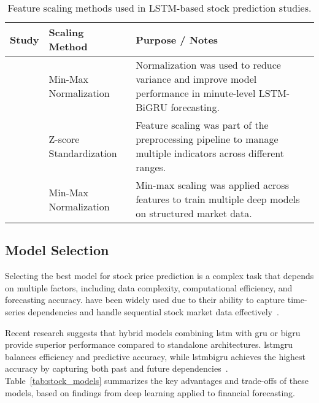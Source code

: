 \begin{table}[H]
\centering
\caption{Feature scaling methods used in LSTM-based stock prediction studies.}
\label{tab:feature-scaling}
\begin{tabular}{p{3.5cm}p{3.2cm}p{6.8cm}} \hline
\textbf{Study} & \textbf{Scaling Method} & \textbf{Purpose / Notes} \\ \hline\hline
\parencite{shaban2024SMPDL} & Min-Max Normalization & Normalization was used to reduce variance and improve model performance in minute-level LSTM-BiGRU forecasting. \\
\parencite{nabipour2020DeepLearning} & Z-score Standardization & Feature scaling was part of the preprocessing pipeline to manage multiple indicators across different ranges.  \\
\parencite{phuoc2024StockPrediction} & Min-Max Normalization & Min-max scaling was applied across features to train multiple deep models on structured market data.  \\
\hline
\end{tabular}
\end{table}

\subsection{Model Selection}

Selecting the best model for stock price prediction is a complex task that depends on
multiple factors, including data complexity, computational efficiency, and forecasting 
accuracy.  have been widely used due to their ability to capture 
time-series dependencies and handle sequential stock market data 
effectively~\parencite{shaban2024SMPDL}.

Recent research suggests that hybrid models combining \acrshort{lstm} with 
\acrshort{gru} or \acrshort{bigru} provide superior performance compared to standalone
architectures. \acrshort{lstmgru} balances efficiency and predictive accuracy, while 
\acrshort{lstmbigru} achieves the highest accuracy by capturing both past and future
dependencies~\parencite{chang2024StockPrediction}. Table~\ref{tab:stock_models} summarizes the key advantages and trade-offs of these models, based on findings from deep learning applied to financial forecasting.

